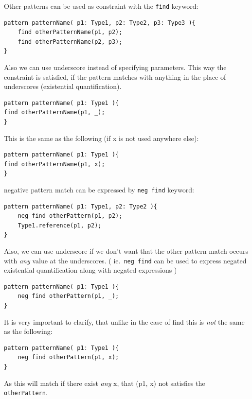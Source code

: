 \begin{minipage}{\textwidth}
Other patterns can be used as constraint with the \texttt{find} keyword:
\begin{lstlisting}[language=vql]
pattern patternName( p1: Type1, p2: Type2, p3: Type3 ){
	find otherPatternName(p1, p2);
	find otherPatternName(p2, p3);
}
\end{lstlisting}

Also we can use underscore instead of specifying parameters. 
This way the constraint is satisfied, if the pattern matches with anything in the place of underscores (existential quantification).
\begin{lstlisting}[language=vql]
pattern patternName( p1: Type1 ){
find otherPatternName(p1, _);
}
\end{lstlisting}

This is the same as the following (if x is not used anywhere else):
\begin{lstlisting}[language=vql]
pattern patternName( p1: Type1 ){
find otherPatternName(p1, x);
}
\end{lstlisting}
\end{minipage}
\vspace{\belowdisplayskip}

\begin{minipage}{\textwidth}
negative pattern match can be expressed by \texttt{neg find} keyword:
\begin{lstlisting}[language=vql]
pattern patternName( p1: Type1, p2: Type2 ){
	neg find otherPattern(p1, p2);
	Type1.reference(p1, p2);
}
\end{lstlisting}

Also, we can use underscore if we don't want that the other pattern match occurs with \emph{any} value at the underscores. ( ie.\ \texttt{neg find} can be used to express negated existential quantification along with negated expressions )

\begin{lstlisting}[language=vql]
pattern patternName( p1: Type1 ){
	neg find otherPattern(p1, _);
}
\end{lstlisting}

It is very important to clarify, that unlike in the case of find this is \emph{not} the same as the following:

\begin{lstlisting}[language=vql]
pattern patternName( p1: Type1 ){
	neg find otherPattern(p1, x);
}
\end{lstlisting}
As this will match if there exist \emph{any} x, that (p1, x) not satisfies the \texttt{otherPattern}.


\end{minipage}
\vspace{\belowdisplayskip}



